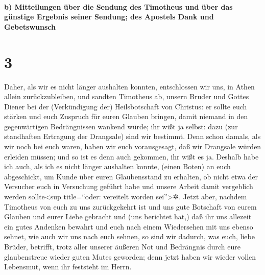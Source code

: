 \hypertarget{b-mitteilungen-uxfcber-die-sendung-des-timotheus-und-uxfcber-das-guxfcnstige-ergebnis-seiner-sendung-des-apostels-dank-und-gebetswunsch}{%
\paragraph{b) Mitteilungen über die Sendung des Timotheus und über das
günstige Ergebnis seiner Sendung; des Apostels Dank und
Gebetswunsch}\label{b-mitteilungen-uxfcber-die-sendung-des-timotheus-und-uxfcber-das-guxfcnstige-ergebnis-seiner-sendung-des-apostels-dank-und-gebetswunsch}}

\hypertarget{section-2}{%
\section{3}\label{section-2}}

 Daher, als wir es nicht länger aushalten konnten,
entschlossen wir uns, in Athen allein zurückzubleiben, 
und sandten Timotheus ab, unsern Bruder und Gottes Diener bei der
(Verkündigung der) Heilsbotschaft von Christus: er sollte euch stärken
und euch Zuspruch für euren Glauben bringen,  damit
niemand in den gegenwärtigen Bedrängnissen wankend würde; ihr wißt ja
selbst: dazu (zur standhaften Ertragung der Drangsale) sind wir
bestimmt.  Denn schon damals, als wir noch bei euch waren,
haben wir euch vorausgesagt, daß wir Drangsale würden erleiden müssen;
und so ist es denn auch gekommen, ihr wißt es ja.  Deshalb
habe ich auch, als ich es nicht länger aushalten konnte, (einen Boten)
an euch abgeschickt, um Kunde über euren Glaubensstand zu erhalten, ob
nicht etwa der Versucher euch in Versuchung geführt habe und unsere
Arbeit damit vergeblich werden sollte\textless sup title=``oder:
vereitelt worden sei''\textgreater✲.  Jetzt aber, nachdem
Timotheus von euch zu uns zurückgekehrt ist und uns gute Botschaft von
eurem Glauben und eurer Liebe gebracht und (uns berichtet hat,) daß ihr
uns allezeit ein gutes Andenken bewahrt und euch nach einem Wiedersehen
mit uns ebenso sehnet, wie auch wir uns nach euch sehnen, 
so sind wir dadurch, was euch, liebe Brüder, betrifft, trotz aller
unserer äußeren Not und Bedrängnis durch eure glaubenstreue wieder guten
Mutes geworden;  denn jetzt haben wir wieder vollen
Lebensmut, wenn ihr feststeht im Herrn.

